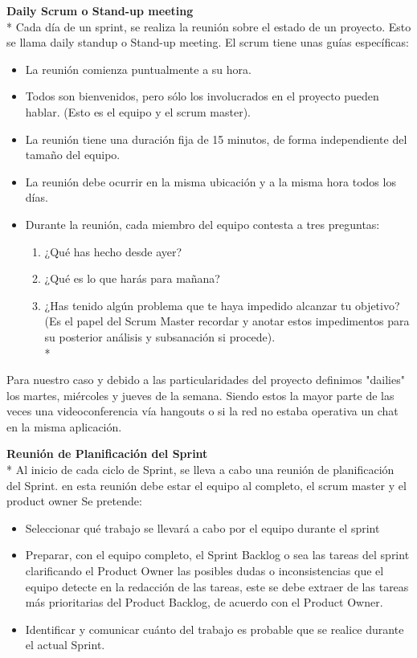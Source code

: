 \documentclass[../pfc.tex]{subfiles}
\begin{document}
	\textbf{Daily Scrum o Stand-up meeting}\\*
	Cada día de un sprint, se realiza la reunión sobre el estado de un proyecto. Esto se llama daily standup o Stand-up meeting. El scrum tiene unas guías específicas:
	\begin{itemize} 
		\item La reunión comienza puntualmente a su hora. 
		\item Todos son bienvenidos, pero sólo los involucrados en el proyecto pueden hablar. (Esto es el equipo y el scrum master). 
		\item La reunión tiene una duración fija de 15 minutos, de forma independiente del tamaño del equipo.
		\item La reunión debe ocurrir en la misma ubicación y a la misma hora todos los días.
		\item Durante la reunión, cada miembro del equipo contesta a tres preguntas:
		\begin{enumerate}
			\item ¿Qué has hecho desde ayer?
			\item ¿Qué es lo que harás para mañana?
			\item ¿Has tenido algún problema que te haya impedido alcanzar tu objetivo? (Es el papel del Scrum Master recordar y anotar estos impedimentos para su posterior análisis y subsanación si procede).\\*
		\end{enumerate} 
	\end{itemize}
	Para nuestro caso y debido a las particularidades del proyecto definimos "dailies" los martes, miércoles y jueves de la semana. Siendo estos la mayor parte de las veces una videoconferencia vía hangouts o si la red no estaba operativa un chat en la misma aplicación.
	
	\textbf{Reunión de Planificación del Sprint}\\*
	Al inicio de cada ciclo de Sprint, se lleva a cabo una reunión de planificación del Sprint. en esta reunión debe estar el equipo al completo, el scrum master y el product owner Se pretende:
	\begin{itemize} 
		\item Seleccionar qué trabajo se llevará a cabo por el equipo durante el sprint 
		\item Preparar, con el equipo completo, el Sprint Backlog o sea las tareas del sprint clarificando el Product Owner las posibles dudas o  inconsistencias que el equipo detecte en la redacción de las tareas, este se debe extraer de las tareas más prioritarias del Product Backlog, de acuerdo con el Product Owner. 
		\item Identificar y comunicar cuánto del trabajo es probable que se realice durante el actual Sprint.
	\end{itemize}
	
\end{document}
